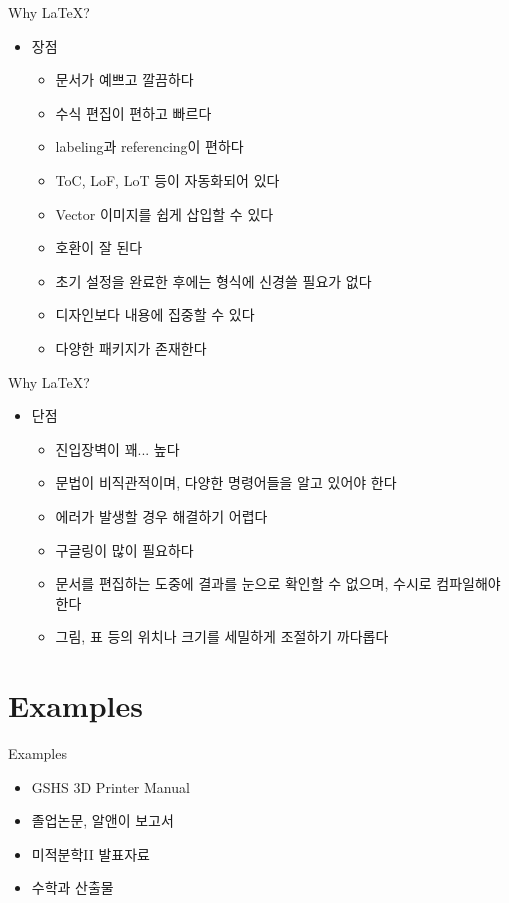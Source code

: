 \documentclass[12pt]{gshs_lecture}
\begin{document}
\begin{frame}[t]{Why \LaTeX?}
	\begin{itemize}
		\item {} 장점
		\begin{itemize}
			\item 문서가 예쁘고 깔끔하다
			\item 수식 편집이 편하고 빠르다
			\item labeling과 referencing이 편하다
			\item ToC, LoF, LoT 등이 자동화되어 있다
			\item Vector 이미지를 쉽게 삽입할 수 있다
			\item 호환이 잘 된다
			\item 초기 설정을 완료한 후에는 형식에 신경쓸 필요가 없다
			\item 디자인보다 내용에 집중할 수 있다
			\item 다양한 패키지가 존재한다			
		\end{itemize}
	\end{itemize}
\end{frame}

\begin{frame}[t]{Why \LaTeX?}
	\begin{itemize}
		\item {} 단점
		\begin{itemize}
			\item 진입장벽이 꽤... 높다
			\item 문법이 비직관적이며, 다양한 명령어들을 알고 있어야 한다
			\item 에러가 발생할 경우 해결하기 어렵다
			\item 구글링이 많이 필요하다			
			\item 문서를 편집하는 도중에 결과를 눈으로 확인할 수 없으며, 수시로 컴파일해야 한다
			\item 그림, 표 등의 위치나 크기를 세밀하게 조절하기 까다롭다
		\end{itemize}
	\end{itemize}
\end{frame}

\section{Examples}

\begin{frame}[t]{Examples}
	\begin{itemize}
		\item GSHS 3D Printer Manual
		\item 졸업논문, 알앤이 보고서
		\item 미적분학II 발표자료
		\item 수학과 산출물
	\end{itemize}
	
\end{frame}
\end{document}
